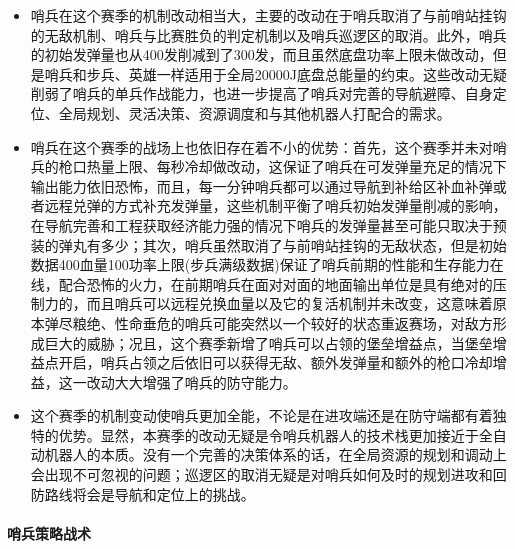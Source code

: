             \begin{itemize}
                \item 哨兵在这个赛季的机制改动相当大，主要的改动在于哨兵取消了与前哨站挂钩的无敌机制、哨兵与比赛胜负的判定机制以及哨兵巡逻区的取消。此外，哨兵的初始发弹量也从400发削减到了300发，而且虽然底盘功率上限未做改动，但是哨兵和步兵、英雄一样适用于全局20000J底盘总能量的约束。这些改动无疑削弱了哨兵的单兵作战能力，也进一步提高了哨兵对完善的导航避障、自身定位、全局规划、灵活决策、资源调度和与其他机器人打配合的需求。
                \item 哨兵在这个赛季的战场上也依旧存在着不小的优势：首先，这个赛季并未对哨兵的枪口热量上限、每秒冷却做改动，这保证了哨兵在可发弹量充足的情况下输出能力依旧恐怖，而且，每一分钟哨兵都可以通过导航到补给区补血补弹或者远程兑弹的方式补充发弹量，这些机制平衡了哨兵初始发弹量削减的影响，在导航完善和工程获取经济能力强的情况下哨兵的发弹量甚至可能只取决于预装的弹丸有多少；其次，哨兵虽然取消了与前哨站挂钩的无敌状态，但是初始数据400血量100功率上限(步兵满级数据)保证了哨兵前期的性能和生存能力在线，配合恐怖的火力，在前期哨兵在面对对面的地面输出单位是具有绝对的压制力的，而且哨兵可以远程兑换血量以及它的复活机制并未改变，这意味着原本弹尽粮绝、性命垂危的哨兵可能突然以一个较好的状态重返赛场，对敌方形成巨大的威胁；况且，这个赛季新增了哨兵可以占领的堡垒增益点，当堡垒增益点开启，哨兵占领之后依旧可以获得无敌、额外发弹量和额外的枪口冷却增益，这一改动大大增强了哨兵的防守能力。
                \item 这个赛季的机制变动使哨兵更加全能，不论是在进攻端还是在防守端都有着独特的优势。显然，本赛季的改动无疑是令哨兵机器人的技术栈更加接近于全自动机器人的本质。没有一个完善的决策体系的话，在全局资源的规划和调动上会出现不可忽视的问题；巡逻区的取消无疑是对哨兵如何及时的规划进攻和回防路线将会是导航和定位上的挑战。
            \end{itemize}

        \paragraph{哨兵策略战术}

        
